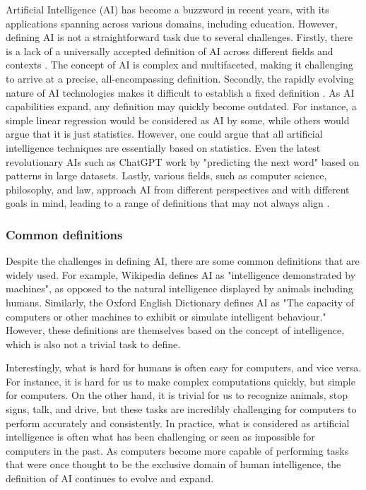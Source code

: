 \documentclass{article}
\begin{document}
Artificial Intelligence (AI) has become a buzzword in recent years, with its
applications spanning across various domains, including education. However,
defining AI is not a straightforward task due to several challenges. Firstly,
there is a lack of a universally accepted definition of AI across different
fields and contexts \cite{Eliot2021DifficultiesIL}.
The concept of AI is complex and multifaceted, making it challenging to arrive
at a precise, all-encompassing definition. Secondly, the rapidly evolving
nature of AI technologies makes it difficult to establish a fixed
definition \cite{Tambuskar2022ChallengesAB} \cite{Cooreman2022CriticalRO}.
As AI capabilities expand, any definition may quickly become outdated.
For instance, a simple linear regression
would be considered as AI by some, while others would argue that it is
just statistics. However, one could argue that all
artificial intelligence techniques are essentially based on statistics.
Even the latest revolutionary AIs such as ChatGPT work by "predicting the next word" based
on patterns in large datasets. Lastly, various fields, such as computer
science, philosophy, and law, approach AI from different perspectives and
with different goals in mind, leading to a range of definitions that may
not always align \cite{Simonsen2022OpenRO} \cite{Rienties2020DefiningTB}.

\subsubsection{Common definitions}

Despite the challenges in defining AI, there are some common definitions
that are widely used. For example, Wikipedia defines AI as "intelligence
demonstrated by machines", as opposed to the natural intelligence displayed
by animals including humans. Similarly, the Oxford English Dictionary
defines AI as "The capacity of computers or other machines to exhibit or
simulate intelligent behaviour." However, these definitions are themselves
based on the concept of intelligence, which is also not a trivial task to
define.

Interestingly, what is hard for humans is often easy for computers, and vice
versa. For instance, it is hard for us to make complex computations quickly,
but simple for computers. On the other hand, it is trivial for us to recognize
animals, stop signs, talk, and drive, but these tasks are incredibly
challenging for computers to perform accurately and consistently. In practice,
what is considered as artificial intelligence is often what has been
challenging or seen as impossible for computers in the past. As computers
become more capable of performing tasks that were once thought to be the
exclusive domain of human intelligence, the definition of AI continues
to evolve and expand.
\end{document}
